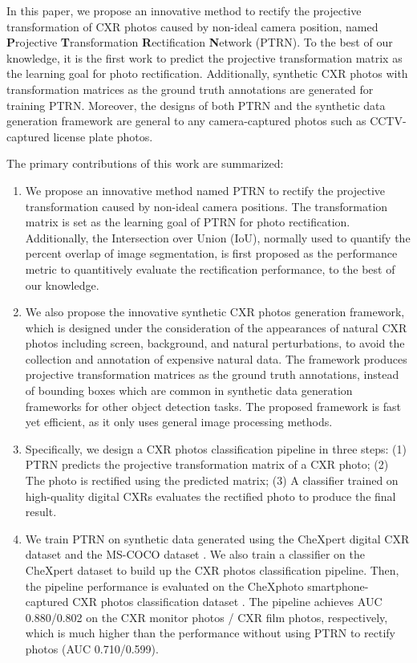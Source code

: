 \documentclass[preprint, 12pt]{elsarticle}
\begin{document}
In this paper, we propose an innovative method to rectify the projective transformation of CXR photos caused by non-ideal camera position, named \textbf{P}rojective \textbf{T}ransformation \textbf{R}ectification \textbf{N}etwork (PTRN). To the best of our knowledge, it is the first work to predict the projective transformation matrix as the learning goal for photo rectification. Additionally, synthetic CXR photos with transformation matrices as the ground truth annotations are generated for training PTRN. Moreover, the designs of both PTRN and the synthetic data generation framework are general to any camera-captured photos such as CCTV-captured license plate photos.

The primary contributions of this work are summarized:

\begin{enumerate}
    \item We propose an innovative method named PTRN to rectify the projective transformation caused by non-ideal camera positions. The transformation matrix is set as the learning goal of PTRN for photo rectification. Additionally, the Intersection over Union (IoU), normally used to quantify the percent overlap of image segmentation, is first proposed as the performance metric to quantitively evaluate the rectification performance, to the best of our knowledge.
    \item We also propose the innovative synthetic CXR photos generation framework, which is designed under the consideration of the appearances of natural CXR photos including screen, background, and natural perturbations, to avoid the collection and annotation of expensive natural data. The framework produces projective transformation matrices as the ground truth annotations, instead of bounding boxes which are common in synthetic data generation frameworks for other object detection tasks. The proposed framework is fast yet efficient, as it only uses general image processing methods.
    \item Specifically, we design a CXR photos classification pipeline in three steps: (1) PTRN predicts the projective transformation matrix of a CXR photo; (2) The photo is rectified using the predicted matrix; (3) A classifier trained on high-quality digital CXRs evaluates the rectified photo to produce the final result.
    \item We train PTRN on synthetic data generated using the CheXpert digital CXR dataset \cite{irvin2019chexpert} and the MS-COCO dataset \cite{lin2014microsoft}. We also train a classifier on the CheXpert dataset to build up the CXR photos classification pipeline. Then, the pipeline performance is evaluated on the CheXphoto smartphone-captured CXR photos classification dataset \cite{phillips2020chexphoto}. The pipeline achieves AUC 0.880/0.802 on the CXR monitor photos / CXR film photos, respectively, which is much higher than the performance without using PTRN to rectify photos (AUC 0.710/0.599). 

\end{enumerate}
\end{document}
